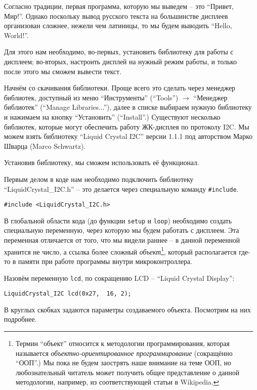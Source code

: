\documentclass[../sparc.tex]{subfiles}
\begin{document}
Согласно традиции, первая программа, которую мы выведем -- это ``Привет, Мир!''.
Однако поскольку вывод русского текста на большинстве дисплеев организован
сложнее, нежели чем латиницы, то мы будем выводить ``Hello, World!''.

Для этого нам необходимо, во-первых, установить библиотеку для работы с
дисплеем; во-вторых, настроить дисплей на нужный режим работы, и только после
этого мы сможем вывести текст.

Начнём со скачивания библиотеки.  Проще всего это сделать через менеджер
библиотек, доступный из меню ``Инструменты'' (``Tools'') $\rightarrow$ ``Менеджер
библиотек'' (``Manage Libraries...''), далее в списке выбираем нужную библиотеку
и нажимаем на кнопку ``Установить'' (``Install''.)  Существуют несколько
библиотек, которые могут обеспечить работу ЖК-дисплея по протоколу \gls{I2C}.
Мы можем взять библиотеку ``Liquid Crystal I2C'' версии 1.1.1 под авторством
Марко Шварца (Marco Schwartz).

Установив библиотеку, мы сможем использовать её функционал.

Первым делом в коде нам необходимо подключить библиотеку
``LiquidCrystal\_I2C.h'' -- это делается через специальную команду
\texttt{\#include}.

\begin{verbatim}
#include <LiquidCrystal_I2C.h>
\end{verbatim}

В глобальной области кода (до функции \texttt{setup} и \texttt{loop}) необходимо
создать специальную переменную, через которую мы будем работать с дисплеем. Эта
переменная отличается от того, что мы видели раннее -- в данной переменной
хранится не число, а ссылка более сложный \emph{объект}\footnote{Термин
``объект'' относится к методологии программирования, которая называется
\emph{объектно-ориентированное программирование} (сокращённо ``ООП''.)  Мы пока
не будем заострять наше внимание на теме ООП, но любознательный читатель может
получить общее представление о данной методологии, например, из соответствующей
статьи в Wikipedia.}, который располагается где-то в памяти при работе программы
внутри микроконтроллера.

Назовём переменную \texttt{lcd}, по сокращению \gls{LCD} -- ``Liquid Crystal
Display'':

\begin{verbatim}
LiquidCrystal_I2C lcd(0x27,  16, 2);
\end{verbatim}

В круглых скобках задаются параметры создаваемого объекта.  Посмотрим на них
подробнее.
\end{document}
